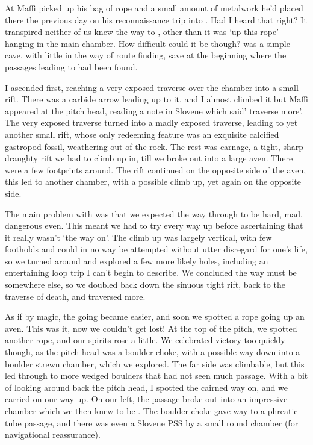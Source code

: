 At  Maffi picked up his bag of rope and a small amount of metalwork he'd placed there the previous day on his reconnaissance trip into . Had I heard that right? It transpired neither of us knew the way to , other than it was `up this rope' hanging in the main chamber. How difficult could it be though?  was a simple cave, with little in the way of route finding, save at the beginning where the passages leading to  had been found.

I ascended first, reaching a very exposed traverse over the chamber into a small rift. There was a carbide arrow leading up to it, and I almost climbed it but Maffi appeared at the pitch head, reading a note in Slovene which said' traverse more'. The very exposed traverse turned into a madly exposed traverse, leading to yet another small rift, whose only redeeming feature was an exquisite calcified gastropod fossil, weathering out of the rock. The rest was carnage, a tight, sharp draughty rift we had to climb up in, till we broke out into a large aven. There were a few footprints around. The rift continued on the opposite side of the aven, this led to another chamber, with a possible climb up, yet again on the opposite side.

The main problem with  was that we expected the way through to be hard, mad, dangerous even. This meant we had to try every way up before ascertaining that it really wasn't `the way on'. The climb up was largely vertical, with few footholds and could in no way be attempted without utter disregard for one's life, so we turned around and explored a few more likely holes, including an entertaining loop trip I can't begin to describe. We concluded the way must be somewhere else, so we doubled back down the sinuous tight rift, back to the traverse of death, and traversed more.

As if by magic, the going became easier, and soon we spotted a rope going up an aven. This was it, now we couldn't get lost! At the top of the pitch, we spotted another rope, and our spirits rose a little. We celebrated victory too quickly though, as the pitch head was a boulder choke, with a possible way down into a boulder strewn  chamber, which we explored. The far side was climbable, but this led through to more wedged boulders that had not seen much passage. With a bit of looking around back the pitch head, I spotted the cairned way on, and we carried on our way up. On our left, the passage broke out into an impressive chamber which we then knew to be . The boulder choke gave way to a phreatic tube passage, and there was even a Slovene PSS by a small round chamber (for navigational reassurance). 

